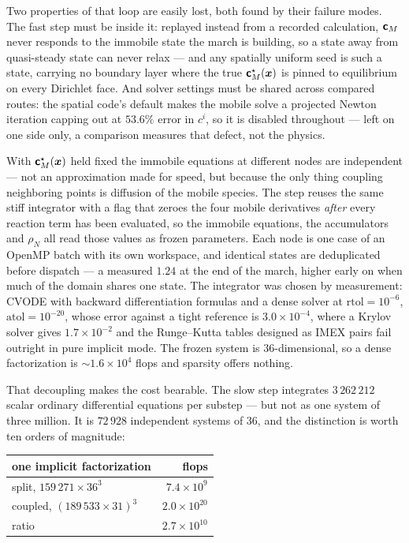 Two properties of that loop are easily lost, both found by their failure modes.
The fast step must be inside it: replayed instead from a recorded calculation,
$\bm{\mathsf{c}}_M$ never responds to the immobile state the march is building, so a
state away from quasi-steady state can never relax --- and any spatially uniform
seed is such a state, carrying no boundary layer where the true
$\bm{\mathsf{c}}^{\star}_M(\bm{x})$ is pinned to equilibrium on every Dirichlet face. And solver settings must be shared across compared routes: the
spatial code's default makes the mobile solve a projected Newton iteration
capping out at $53.6\%$ error in $c^{i}$, so it is disabled throughout ---
left on one side only, a comparison measures that defect, not the physics.

With $\bm{\mathsf{c}}^{\star}_M(\bm{x})$ held fixed the immobile equations at different
nodes are independent --- not an approximation made for speed, but because the
only thing coupling neighboring points is diffusion of the mobile species. The step reuses the same
stiff integrator with a flag that zeroes the four mobile derivatives
\emph{after} every reaction term has been evaluated, so the immobile equations,
the accumulators and $\rho_N$ all read those values as frozen parameters. Each node is one case of an OpenMP batch with
its own workspace, and identical states are deduplicated before dispatch --- a
measured $1.24$ at the end of the march, higher early on when much of the domain
shares one state. The integrator was chosen by measurement:
CVODE with backward differentiation formulas and a dense solver at
$\mathrm{rtol}=10^{-6}$, $\mathrm{atol}=10^{-20}$, whose error against a tight
reference is $3.0\times10^{-4}$, where a Krylov solver gives $1.7\times10^{-2}$
and the Runge--Kutta tables designed as IMEX pairs fail outright in pure
implicit mode. The frozen system is $36$-dimensional, so a dense factorization
is $\sim1.6\times10^{4}$ flops and sparsity offers nothing.

That decoupling makes the cost bearable. The slow step integrates
$3\,262\,212$ scalar ordinary differential equations per substep --- but not as
one system of three million. It is $72\,928$ independent systems of $36$, and
the distinction is worth ten orders of magnitude:

\begin{center}
\begin{tabular}{@{}lr@{}}
\toprule
one implicit factorization & flops \\
\midrule
split, $159\,271\times36^{3}$ & $7.4\times10^{9}$ \\
coupled, $(189\,533\times31)^{3}$ & $2.0\times10^{20}$ \\
\midrule
ratio & $2.7\times10^{10}$ \\
\bottomrule
\end{tabular}
\end{center}

